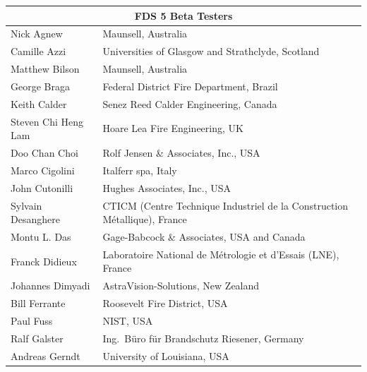 \documentclass[11pt]{book}
\begin{document}
\begin{longtable}{|l|l|}
\hline
\multicolumn{2}{|c|}{\bf FDS 5 Beta Testers} \\ \hline \hline
Nick Agnew                              & Maunsell, Australia                  \\ \hline
Camille Azzi                            & Universities of Glasgow and Strathclyde, Scotland                  \\ \hline
Matthew Bilson                          & Maunsell, Australia                  \\ \hline
George Braga                            & Federal District Fire Department, Brazil                  \\ \hline
Keith Calder                            & Senez Reed Calder Engineering, Canada                  \\ \hline
Steven Chi Heng Lam                     & Hoare Lea Fire Engineering, UK                  \\ \hline
Doo Chan Choi                           & Rolf Jensen \& Associates, Inc., USA                  \\ \hline
Marco Cigolini                          & Italferr spa, Italy                  \\ \hline
John Cutonilli                          & Hughes Associates, Inc., USA \\ \hline
Sylvain Desanghere                      & CTICM (Centre Technique Industriel de la Construction M\'{e}tallique), France                  \\ \hline
Montu L. Das                            & Gage-Babcock \& Associates, USA and Canada                  \\ \hline
Franck Didieux                          & Laboratoire National de M\'{e}trologie et d'Essais (LNE), France                  \\ \hline
Johannes Dimyadi                        & AstraVision-Solutions, New Zealand                  \\ \hline
Bill Ferrante                           & Roosevelt Fire District, USA                  \\ \hline
Paul Fuss                               & NIST, USA    \\ \hline
Ralf Galster                            & Ing.~B\"{u}ro f\"{u}r Brandschutz Riesener, Germany                  \\ \hline
Andreas Gerndt                          & University of Louisiana, USA                  \\ \hline

\end{longtable}
\end{document}
